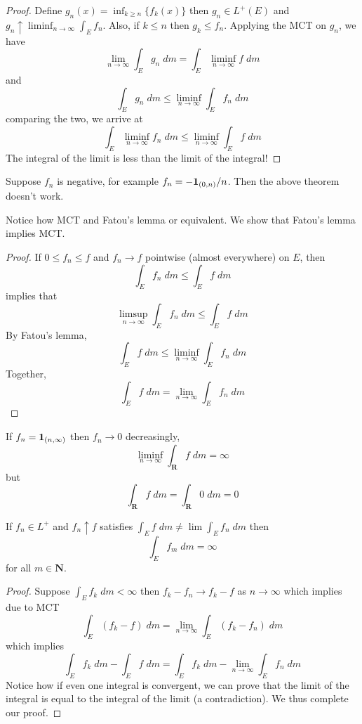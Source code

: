 \vspace{2ex}
\begin{proof}
Define $g_{n}(x)=\inf_{k\geq n}\{f_{k}(x)\}$ then $g_{n}\in L^{+}(E)$ and $g_{n}\uparrow\liminf_{n\rightarrow \infty } \int _{E}f_{n}$. Also, if $k \leq n$ then $g_{k}\leq f_{n}$. Applying the MCT on $g_{n}$, we have
\[\lim_{n\rightarrow \infty } \int _{E}g_{n}\;d m=\int _{E}\liminf_{n\rightarrow \infty } f\;d m\]
and
\[\int _{E}g_{n}\;d m\leq \liminf_{n\rightarrow \infty } \int _{E}f_{n}\;d m\]
comparing the two, we arrive at
\[\int _{E}\liminf_{n\rightarrow \infty } f_{n}\;d m\leq \liminf_{n\rightarrow \infty } \int _{E}f\;d m\]
The integral of the limit is less than the limit of the integral!
\end{proof}
\vspace{2ex}
\begin{ex}
Suppose $f_{n}$ is negative, for example $f_{n}=-{\bf 1}_{(0,n)}/n$. Then the above theorem doesn't work.
\end{ex}
\vspace{2ex}
\begin{rmk}
Notice how MCT and Fatou's lemma or equivalent. We show that Fatou's lemma implies MCT.
\end{rmk}
\vspace{2ex}
\begin{proof}
If $0\leq f_{n}\leq f$ and $f_{n}\rightarrow f$ pointwise (almost everywhere) on $E$, then
\[\int _{E}f_{n}\;d m\leq \int _{E}f\;d m\]
implies that
\[\limsup_{n\rightarrow \infty }\int _{E}f_{n}\;d m\leq \int _{E}f\;d m\]
By Fatou's lemma, 
\[\int _{E}f\;d m\leq \liminf_{n\rightarrow \infty }\int _{E}f_{n}\;d m\]
Together,
\[\int _{E}f\;d m=\lim_{n\rightarrow \infty } \int _{E}f_{n}\;d m\]
\end{proof}
\vspace{2ex}
\begin{ex}
If $f_{n}={\bf 1}_{(n,\infty )}$ then $f_{n}\rightarrow 0$ decreasingly,
\[\liminf_{n\rightarrow \infty }\int _{{\bm R}}f\;d m=\infty \]
but
\[\int _{{\bm R}}f\;d m=\int _{{\bm R}}0\;d m=0\]
\end{ex}
\vspace{2ex}
\begin{cor}
If $f_{n}\in L^{+}$ and $f_{n}\uparrow f$ satisfies $\int _{E}f\;d m\ne \lim \int _{E}f_{n}\;d m$ then
\[\int_{E}f_{m}\;d m=\infty \]
for all $m\in {\bm N}$. 
\end{cor}
\vspace{2ex}
\begin{proof}
Suppose $\int _{E}f_{k}\;d m<\infty $ then $f_{k}-f_{n}\rightarrow f_{k}-f$ as $n\rightarrow \infty $ which implies due to MCT
\[\int _{E}(f_{k}-f)\;d m=\lim _{n\rightarrow \infty }\int _{E}(f_{k}-f_{n})\;d m\]
which implies 
\[\int _{E}f_{k}\;d m-\int _{E}f\;d m=\int _{E}f_{k}\;d m-\lim _{n\rightarrow \infty }\int _{E}f_{n}\;d m\]
Notice how if even one integral is convergent, we can prove that the limit of the integral is equal to the integral of the limit (a contradiction). We thus complete our proof. 
\end{proof}
